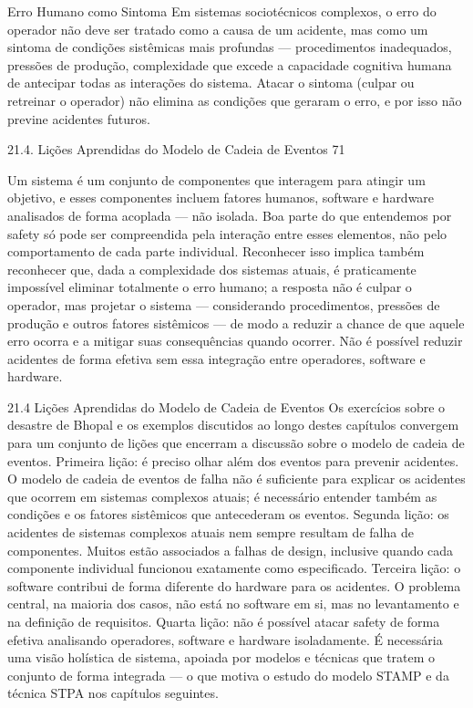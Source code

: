 Erro Humano como Sintoma Em sistemas sociotécnicos complexos, o erro do operador não deve ser tratado como a causa de um acidente, mas como um sintoma de condições sistêmicas mais profundas — procedimentos inadequados, pressões de produção, complexidade que excede a capacidade cognitiva humana de antecipar todas as interações do sistema. Atacar o sintoma (culpar ou retreinar o operador) não elimina as condições que geraram o erro, e por isso não previne acidentes futuros.

21.4. Lições Aprendidas do Modelo de Cadeia de Eventos 71

Um sistema é um conjunto de componentes que interagem para atingir um objetivo, e esses componentes incluem fatores humanos, software e hardware analisados de forma acoplada — não isolada. Boa parte do que entendemos por safety só pode ser compreendida pela interação entre esses elementos, não pelo comportamento de cada parte individual. Reconhecer isso implica também reconhecer que, dada a complexidade dos sistemas atuais, é praticamente impossível eliminar totalmente o erro humano; a resposta não é culpar o operador, mas projetar o sistema — considerando procedimentos, pressões de produção e outros fatores sistêmicos — de modo a reduzir a chance de que aquele erro ocorra e a mitigar suas consequências quando ocorrer. Não é possível reduzir acidentes de forma efetiva sem essa integração entre operadores, software e hardware.

21.4 Lições Aprendidas do Modelo de Cadeia de Eventos Os exercícios sobre o desastre de Bhopal e os exemplos discutidos ao longo destes capítulos convergem para um conjunto de lições que encerram a discussão sobre o modelo de cadeia de eventos. Primeira lição: é preciso olhar além dos eventos para prevenir acidentes. O modelo de cadeia de eventos de falha não é suficiente para explicar os acidentes que ocorrem em sistemas complexos atuais; é necessário entender também as condições e os fatores sistêmicos que antecederam os eventos. Segunda lição: os acidentes de sistemas complexos atuais nem sempre resultam de falha de componentes. Muitos estão associados a falhas de design, inclusive quando cada componente individual funcionou exatamente como especificado. Terceira lição: o software contribui de forma diferente do hardware para os acidentes. O problema central, na maioria dos casos, não está no software em si, mas no levantamento e na definição de requisitos. Quarta lição: não é possível atacar safety de forma efetiva analisando operadores, software e hardware isoladamente. É necessária uma visão holística de sistema, apoiada por modelos e técnicas que tratem o conjunto de forma integrada — o que motiva o estudo do modelo STAMP e da técnica STPA nos capítulos seguintes.

